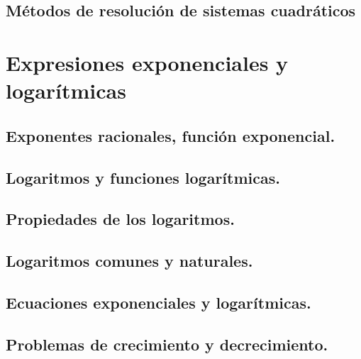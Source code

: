\subsection{Métodos de resolución de sistemas cuadráticos}







\section{Expresiones exponenciales y logarítmicas} %
\subsection{Exponentes racionales, función exponencial.}
\subsection{Logaritmos y funciones logarítmicas.}
\subsection{Propiedades de los logaritmos.}
\subsection{Logaritmos comunes y naturales.}
\subsection{Ecuaciones exponenciales y logarítmicas.}
\subsection{Problemas de crecimiento y decrecimiento.}
